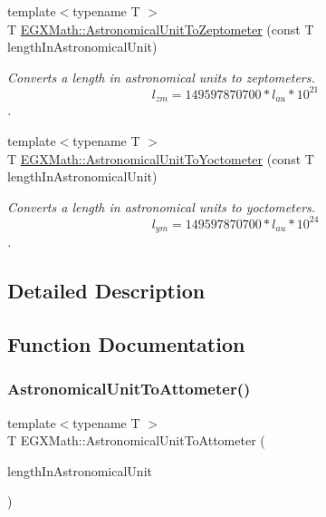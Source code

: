 \begin{DoxyCompactItemize}
{\footnotesize template$<$typename T $>$ }\\T \mbox{\hyperlink{group___e_g_x_math-_conversions-_length_conversions-_astronomical-_astronomical_unit-_s_i_ga1b83999f8a97d59122f34bd7af3c6cf5}{E\+G\+X\+Math\+::\+Astronomical\+Unit\+To\+Zeptometer}} (const T length\+In\+Astronomical\+Unit)
\begin{DoxyCompactList}\small\item\em Converts a length in astronomical units to zeptometers. \[ l_{zm}=149597870700 * l_{au} * 10^{21} \]. \end{DoxyCompactList}\item 
{\footnotesize template$<$typename T $>$ }\\T \mbox{\hyperlink{group___e_g_x_math-_conversions-_length_conversions-_astronomical-_astronomical_unit-_s_i_gab3a722bc0fc1b42aeeec0683351a3181}{E\+G\+X\+Math\+::\+Astronomical\+Unit\+To\+Yoctometer}} (const T length\+In\+Astronomical\+Unit)
\begin{DoxyCompactList}\small\item\em Converts a length in astronomical units to yoctometers. \[ l_{ym}=149597870700 * l_{au} * 10^{24} \]. \end{DoxyCompactList}\end{DoxyCompactItemize}


\subsection{Detailed Description}


\subsection{Function Documentation}
\mbox{\label{group___e_g_x_math-_conversions-_length_conversions-_astronomical-_astronomical_unit-_s_i_ga6a7dd29c7c91e4ec30e4bb2fe7110210}} 
\subsubsection{\texorpdfstring{Astronomical\+Unit\+To\+Attometer()}{AstronomicalUnitToAttometer()}}
{\footnotesize\ttfamily template$<$typename T $>$ \\
T E\+G\+X\+Math\+::\+Astronomical\+Unit\+To\+Attometer (\begin{DoxyParamCaption}\item[{const T}]{length\+In\+Astronomical\+Unit }\end{DoxyParamCaption})}



